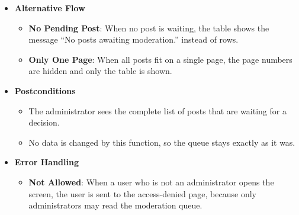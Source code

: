 \begin{itemize}[leftmargin=1.6em,topsep=4pt,itemsep=3pt,parsep=0pt,label=$\bullet$]
\begin{itemize}[leftmargin=2.2em,topsep=2pt,itemsep=3pt,parsep=0pt,label=$\circ$]
\begin{itemize}[leftmargin=2.2em,topsep=2pt,itemsep=3pt,parsep=0pt,label=$\blacksquare$]
                \end{itemize}
            \item \textbf{Read the Score Colour}: The score badge uses a colour that reflects the risk level.
                \begin{itemize}[leftmargin=2.2em,topsep=2pt,itemsep=3pt,parsep=0pt,label=$\blacksquare$]
                    \item A score of 0.80 or more is shown in red, a score from 0.30 to 0.79 is shown in amber and a score below 0.30 is shown in green.
                \end{itemize}
            \item \textbf{Move Between Pages}: When there is more than one page, the user uses the page numbers or the \textbf{Previous} and \textbf{Next} buttons at the bottom of the list, and the counter shows ``Page x of y (n total)''.
            \item \textbf{Choose an Item}: The user opens, approves or rejects a post with the action buttons at the end of the row (see \textbf{View Moderation Item Detail} and \textbf{Resolve Moderation Item}).
        \end{itemize}
    \item \textbf{Alternative Flow}
        \begin{itemize}[leftmargin=2.2em,topsep=2pt,itemsep=3pt,parsep=0pt,label=$\circ$]
            \item \textbf{No Pending Post}: When no post is waiting, the table shows the message ``No posts awaiting moderation.'' instead of rows.
            \item \textbf{Only One Page}: When all posts fit on a single page, the page numbers are hidden and only the table is shown.
        \end{itemize}
    \item \textbf{Postconditions}
        \begin{itemize}[leftmargin=2.2em,topsep=2pt,itemsep=3pt,parsep=0pt,label=$\circ$]
            \item The administrator sees the complete list of posts that are waiting for a decision.
            \item No data is changed by this function, so the queue stays exactly as it was.
        \end{itemize}
    \item \textbf{Error Handling}
        \begin{itemize}[leftmargin=2.2em,topsep=2pt,itemsep=3pt,parsep=0pt,label=$\circ$]
            \item \textbf{Not Allowed}: When a user who is not an administrator opens the screen, the user is sent to the access-denied page, because only administrators may read the moderation queue.

\end{itemize}
\end{itemize}
